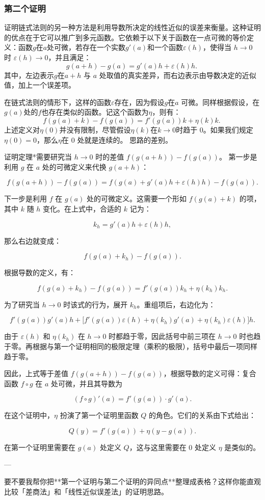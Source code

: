 \subsubsection{第二个证明}
证明链式法则的另一种方法是利用导数所决定的线性近似的误差来衡量。这种证明的优点在于它可以推广到多元函数。它依赖于以下关于函数在一点可微的等价定义：函数$g$在$a$处可微，若存在一个实数$g'(a)$和一个函数$\varepsilon(h)$，使得当 $h \to 0$ 时 $\varepsilon(h) \to 0$，并且满足：
$$
g(a+h) - g(a) = g'(a)h + \varepsilon(h)h.~
$$
其中，左边表示$g$在$a+h$ 与 $a$ 处取值的真实差异，而右边表示由导数决定的近似值，加上一个误差项。

在链式法则的情形下，这样的函数$\varepsilon$存在，因为假设$g$在$a$ 可微。同样根据假设，在$g(a)$处的$f$也存在类似的函数。记这个函数为$\eta$，则有：
$$
f(g(a)+k) - f(g(a)) = f'(g(a))k + \eta(k)k.~
$$
上述定义对$\eta(0)$并没有限制，尽管假设$\eta(k)$在$k \to 0$时趋于 0。如果我们规定$\eta(0) = 0$，那么$\eta$在 0 处就是连续的。
思路的差别。

证明定理*需要研究当 $h \to 0$ 时的差值 $f(g(a+h)) - f(g(a))$。
第一步是利用 $g$ 在 $a$ 处的可微定义来代换 $g(a+h)$：

$$
f(g(a+h)) - f(g(a)) = f(g(a) + g'(a)h + \varepsilon(h)h) - f(g(a)).
$$

下一步是利用 $f$ 在 $g(a)$ 处的可微定义。这需要一个形如 $f(g(a)+k)$ 的项，其中 $k$ 随 $h$ 变化。在上式中，合适的 $k$ 记为：

$$
k_h = g'(a)h + \varepsilon(h)h,
$$

那么右边就变成：

$$
f(g(a)+k_h) - f(g(a)).
$$

根据导数的定义，有：

$$
f(g(a)+k_h) - f(g(a)) = f'(g(a))k_h + \eta(k_h)k_h.
$$

为了研究当 $h \to 0$ 时该式的行为，展开 $k_h$。重组项后，右边化为：

$$
f'(g(a))g'(a)h + \bigl[f'(g(a))\varepsilon(h) + \eta(k_h)g'(a) + \eta(k_h)\varepsilon(h)\bigr]h.
$$

由于 $\varepsilon(h)$ 和 $\eta(k_h)$ 在 $h \to 0$ 时都趋于零，因此括号中前三项在 $h \to 0$ 时也趋于零。再根据与第一个证明相同的极限定理（乘积的极限），括号中最后一项同样趋于零。

因此，上式等于差值 $f(g(a+h)) - f(g(a))$，根据导数的定义可得：复合函数 $f \circ g$ 在 $a$ 处可微，并且其导数为

$$
(f \circ g)'(a) = f'(g(a)) \cdot g'(a).
$$

在这个证明中，$\eta$ 扮演了第一个证明里函数 $Q$ 的角色。它们的关系由下式给出：

$$
Q(y) = f'(g(a)) + \eta(y-g(a)).
$$

在第一个证明里需要在 $g(a)$ 处定义 $Q$，这与这里需要在 0 处定义 $\eta$ 是类似的。

---

要不要我帮你把**第一个证明与第二个证明的异同点**整理成表格？这样你能直观比较「差商法」和「线性近似误差法」的证明思路。
